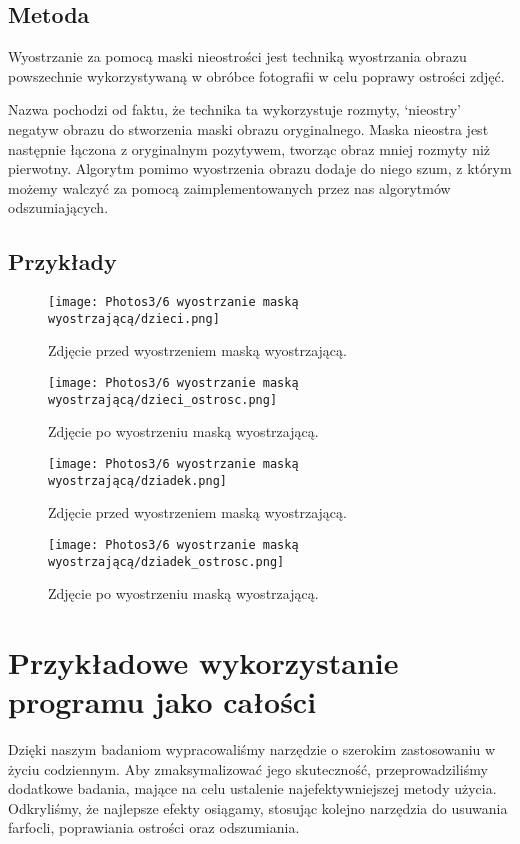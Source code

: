 \documentclass[]{mwart}
\begin{document}
\subsection{Metoda}
Wyostrzanie za pomocą maski nieostrości jest techniką wyostrzania obrazu
powszechnie wykorzystywaną w obróbce fotografii w celu poprawy ostrości zdjęć.

Nazwa pochodzi od faktu, że technika ta wykorzystuje rozmyty,
`nieostry' negatyw obrazu do stworzenia maski obrazu oryginalnego.
Maska nieostra jest następnie łączona z oryginalnym pozytywem,
tworząc obraz mniej rozmyty niż pierwotny. Algorytm pomimo wyostrzenia obrazu dodaje
do niego szum, z którym możemy walczyć za pomocą zaimplementowanych przez nas algorytmów odszumiających.

\subsection{Przykłady}
\begin{figure}[H]
    \centering
    \texttt{[image: Photos3/6 wyostrzanie maską wyostrzającą/dzieci.png]}
    \caption{Zdjęcie przed wyostrzeniem maską wyostrzającą.}
\end{figure}
\begin{figure}[H]
    \centering
    \texttt{[image: Photos3/6 wyostrzanie maską wyostrzającą/dzieci\_ostrosc.png]}
    \caption{Zdjęcie po wyostrzeniu maską wyostrzającą.}
\end{figure}

\begin{figure}[H]
    \centering
    \texttt{[image: Photos3/6 wyostrzanie maską wyostrzającą/dziadek.png]}
    \caption{Zdjęcie przed wyostrzeniem maską wyostrzającą.}
\end{figure}
\begin{figure}[H]
    \centering
    \texttt{[image: Photos3/6 wyostrzanie maską wyostrzającą/dziadek\_ostrosc.png]}
    \caption{Zdjęcie po wyostrzeniu maską wyostrzającą.}
\end{figure}








\newpage
\section{Przykładowe wykorzystanie programu jako całości}
Dzięki naszym badaniom wypracowaliśmy narzędzie o szerokim zastosowaniu w życiu codziennym.
Aby zmaksymalizować jego skuteczność, przeprowadziliśmy dodatkowe badania,
mające na celu ustalenie najefektywniejszej metody użycia. Odkryliśmy, że najlepsze efekty osiągamy,
stosując kolejno narzędzia do usuwania farfocli, poprawiania ostrości oraz odszumiania.
\end{document}
